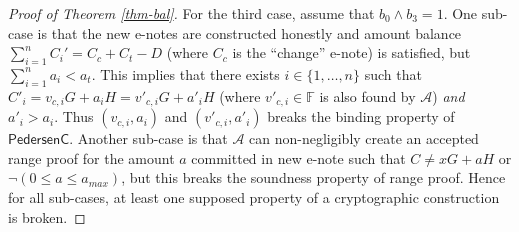 \documentclass{article}
\begin{document}
\begin{proof}[Proof of Theorem \ref{thm-bal}]
For the third case, assume that $b_0 \wedge b_3= 1$. One sub-case is that the new e-notes are constructed honestly and amount balance $\sum_{i=1}^n{C_i'} = C_c + C_t - D$ (where $C_c$ is the ``change'' e-note) is satisfied, but $\sum_{i=1}^n{a_i} < a_t$. This implies that there exists $i\in\{1,\ldots,n\}$ such that $C'_i = v_{c,i} G + a_i H = v'_{c,i} G + a'_i H$ (where $v'_{c,i}\in\mathbb{F}$ is also found by $\mathcal{A}$) \textit{and} $a'_i > a_i$. Thus $( v_{c,i}, a_i)$ and $(v'_{c,i}, a'_i)$ breaks the binding property of $\textsf{PedersenC}$. Another sub-case is that $\mathcal{A}$ can non-negligibly create an accepted range proof for the amount $a$ committed in new e-note such that $C \ne x G + a H$ or $\neg (0 \le a \le a_{max})$, but this breaks the soundness property of range proof. Hence for all sub-cases, at least one supposed property of a cryptographic construction is broken.
\end{proof}
\end{document}
